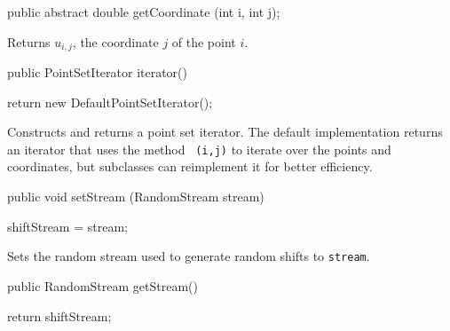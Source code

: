 \begin{code}

   public abstract double getCoordinate (int i, int j);
\end{code}
 \begin{tabb}
   Returns $u_{i,j}$, the coordinate $j$ of the point $i$.
 \end{tabb}
\begin{htmlonly}
\end{htmlonly}
\begin{code}

   public PointSetIterator iterator()\begin{hide} {
      return new DefaultPointSetIterator();
   }\end{hide}
\end{code}
\begin{tabb}
 Constructs and returns a point set iterator.
 The default implementation returns an iterator that uses the method
 ~\texttt{(i,j)} to iterate over the
 points and coordinates, but subclasses can reimplement it
 for better efficiency.
\end{tabb}
\begin{htmlonly}
\end{htmlonly}
\begin{code}

   public void setStream (RandomStream stream)\begin{hide} {
      shiftStream = stream;
  }\end{hide}
\end{code}
 \begin{tabb}
   Sets the random stream used to generate random shifts to \texttt{stream}.
 \end{tabb}
\begin{htmlonly}
\end{htmlonly}
\begin{code}

   public RandomStream getStream()\begin{hide} {
      return shiftStream;
  }\end{hide}
\end{code}
